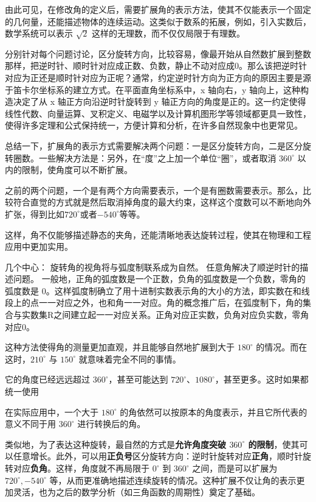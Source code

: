 由此可见，在修改角的定义后，需要扩展角的表示方法，使其不仅能表示一个固定的几何量，还能描述物体的连续运动。这类似于数系的拓展，例如，引入实数后，数学系统可以表示 $\sqrt{2}$ 这样的无理数，而不仅仅局限于有理数。

分别针对每个问题讨论，区分旋转方向，比较容易，像最开始从自然数扩展到整数那样，把逆时针、顺时针对应成正数、负数，静止不动对应成$0$。那么该把逆时针对应为正还是顺时针对应为正呢？通常，约定逆时针方向为正方向的原因主要是源于笛卡尔坐标系的建立方式。在平面直角坐标系中，x 轴向右，y 轴向上，这种构造决定了从 x 轴正方向沿逆时针旋转到 y 轴正方向的角度是正的。这一约定使得线性代数、向量运算、叉积定义、电磁学以及计算机图形学等领域都更具一致性，使得许多定理和公式保持统一，方便计算和分析，在许多自然现象中也更常见。


总结一下，扩展角的表示方式需要解决两个问题：一是区分旋转方向，二是区分旋转圈数。一些解决方法是：另外，在“度”之上加一个单位“圈”，或者取消 $360^\circ$ 以内的限制，使角度可以不断扩展。



之前的两个问题，一个是有两个方向需要表示，一个是有圈数需要表示。那么，比较符合直觉的方式就是然后取消掉角度的最大约束，这样这个度数可以不断地向外扩张，得到比如$720^\circ$或者$-540^\circ$等等。



这样，角不仅能够描述静态的夹角，还能清晰地表达旋转过程，使其在物理和工程应用中更加实用。

几个中心：
旋转角的视角将与弧度制联系成为自然。
任意角解决了顺逆时针的描述问题。
一般地，正角的弧度数是一个正数，负角的弧度数是一个负数，零角的弧度数是 $0$。这样弧度制确立了用十进制实数表示角的大小的方法，即实数在和线段上的点一一对应之外，也和角一一对应。角的概念推广后，在弧度制下，角的集合与实数集R之间建立起一一对应关系。正角对应正实数，负角对应负实数，零角对应0。





这种方法使得角的测量更加直观，并且能够自然地扩展到大于 $180^\circ$ 的情况。而在这时，$210^\circ$ 与 $150^\circ$ 就意味着完全不同的事情。

它的角度已经远远超过 $360^\circ$，甚至可能达到 $720^\circ$、$1080^\circ$，甚至更多。这时如果都统一使用

在实际应用中，一个大于 $180^\circ$ 的角依然可以按原本的角度表示，并且它所代表的意义不同于用 $360^\circ$ 进行转换后的角。


类似地，为了表达这种旋转，最自然的方式是\textbf{允许角度突破 $360^\circ$ 的限制}，使其可以任意增长。此外，可以用\textbf{正负号}区分旋转方向：逆时针旋转对应\textbf{正角}，顺时针旋转对应\textbf{负角}。这样，角度就不再局限于 $0^\circ$ 到 $360^\circ$ 之间，而是可以扩展为 $720^\circ, -540^\circ$ 等，从而更准确地描述连续旋转的情况。这种扩展不仅让角的表示更加灵活，也为之后的数学分析（如三角函数的周期性）奠定了基础。


